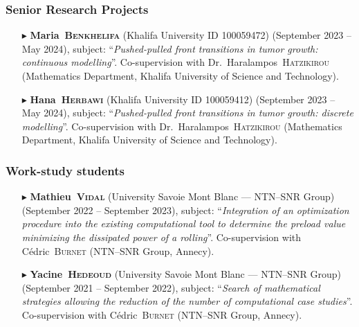         \separator
        \subsubsection{Senior Research Projects}
        \begin{itemize}
            \item[$\blacktriangleright$] \textbf{Maria~\textsc{Benkhelifa}} (Khalifa University ID 100059472) (September 2023 -- May 2024), subject: ``\textit{Pushed-pulled front transitions in tumor growth: continuous modelling}''. Co-supervision with Dr.~Haralampos~\textsc{Hatzikirou} (Mathematics Department, Khalifa University of Science and Technology).
            \item[$\blacktriangleright$] \textbf{Hana~\textsc{Herbawi}} (Khalifa University ID 100059412) (September 2023 -- May 2024), subject: ``\textit{Pushed-pulled front transitions in tumor growth: discrete modelling}''. Co-supervision with Dr.~Haralampos~\textsc{Hatzikirou} (Mathematics Department, Khalifa University of Science and Technology).
        \end{itemize}

        \separator
        \subsubsection{Work-study students}
        \begin{itemize}
            \item[$\blacktriangleright$] \textbf{Mathieu~\textsc{Vidal}} (University Savoie Mont Blanc --- NTN--SNR Group) (September 2022 -- September 2023), subject: ``\textit{Integration of an optimization procedure into the existing computational tool to determine the preload value minimizing the dissipated power of a rolling}''. Co-supervision with C\'edric~\textsc{Burnet} (NTN--SNR Group, Annecy).
            \item[$\blacktriangleright$] \textbf{Yacine~\textsc{Hedeoud}} (University Savoie Mont Blanc --- NTN--SNR Group) (September 2021 -- September 2022), subject: ``\textit{Search of mathematical strategies allowing the reduction of the number of computational case studies}''. Co-supervision with C\'edric~\textsc{Burnet} (NTN--SNR Group, Annecy).
        \end{itemize}

        \separator
